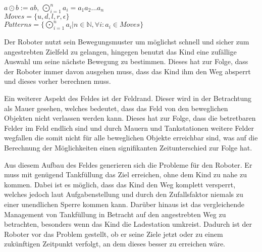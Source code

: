 \begin{center}
	$a\odot b := ab$, $\bigodot\limits_{i=1}^n a_i = a_1a_2 \dots a_n$\\
	$Moves = \{u, d, l, r, \epsilon\}$\\
	$Patterns = \{\bigodot\limits_{i=1}^n a_i | n \in \mathbb{N}, \forall i : a_i \in Moves\}$
\end{center}

\par
Der Roboter nutzt sein Bewegungsmuster um möglichst schnell und sicher zum angestrebten Zielfeld zu gelangen, hingegen benutzt das Kind eine zufällige Auswahl um seine nächste Bewegung zu bestimmen. Dieses hat zur Folge, dass der Roboter immer davon ausgehen muss, dass das Kind ihm den Weg absperrt und dieses vorher berechnen muss. \par
Ein weiterer Aspekt des Feldes ist der Feldrand. Dieser wird in der Betrachtung als Mauer gesehen, welches bedeutet, dass das Feld von den beweglichen Objekten nicht verlassen werden kann. Dieses hat zur Folge, dass die betretbaren Felder im Feld endlich sind und durch Mauern und Tankstationen weitere Felder wegfallen die somit nicht für alle beweglichen Objekte erreichbar sind, was auf die Berechnung der Möglichkeiten einen signifikanten Zeitunterschied zur Folge hat. \par
Aus diesem Aufbau des Feldes generieren sich die Probleme für den Roboter. Er muss mit genügend Tankfüllung das Ziel erreichen, ohne dem Kind zu nahe zu kommen. Dabei ist es möglich, dass das Kind den Weg komplett versperrt, welches jedoch laut Aufgabenstellung und durch den Zufallsfaktor niemals zu einer unendlichen Sperre kommen kann. Darüber hinaus ist das vergleichende Management von Tankfüllung in Betracht auf den angestrebten Weg zu betrachten, besonders wenn das Kind die Ladestation umkreist. Dadurch ist der Roboter vor das Problem gestellt, ob er seine Ziele jetzt oder zu einem zukünftigen Zeitpunkt verfolgt, an dem dieses besser zu erreichen wäre.

